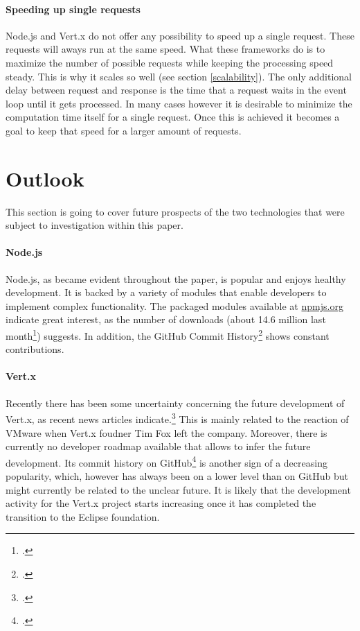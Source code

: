 \paragraph{Speeding up single requests}
Node.js and Vert.x do not offer any possibility to speed up a single request.
These requests will aways run at the same speed. What these frameworks do is to
maximize the number of possible requests while keeping the processing speed
steady. This is why it scales so well (see section \ref{scalability}). The only
additional delay between request and response is the time that a request waits
in the event loop until it gets processed.  In many cases however it is
desirable to minimize the computation time itself for a single request. Once
this is achieved it becomes a goal to keep that speed for a larger amount of
requests.\\


\section{Outlook}

This section is going to cover future prospects of the two technologies that were subject to investigation within this paper.

\paragraph{Node.js} Node.js, as became evident throughout the paper, is popular and enjoys healthy development. It is backed by a variety of modules that enable developers to implement complex functionality. The packaged modules available at \url{npmjs.org} indicate great interest, as the number of downloads (about 14.6 million last month\footcite[Cf.][]{node_packages}) suggests. In addition, the GitHub Commit History\footcite[Cf.][]{vertxcommithistory_2013} shows constant contributions. 

\paragraph{Vert.x} Recently there has been some uncertainty concerning the future
development of Vert.x, as recent news articles
indicate.\footcite[Cf.][]{Asay_2013} This is mainly related to the reaction of
VMware when Vert.x foudner Tim Fox left the company. Moreover, there is
currently no developer roadmap available that allows to infer the future
development. Its commit history on
GitHub\footcite[Cf.][]{vertxcommithistory_2013} is another sign of a decreasing
popularity, which, however has always been on a lower level than on GitHub but
might currently be related to the unclear future. It is likely that the development
activity for the Vert.x project starts increasing once it has completed the transition
 to the Eclipse foundation.

